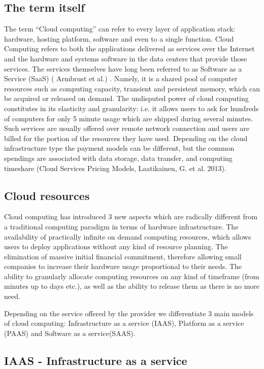 \documentclass[licencjacka,en]{thesisclass}
\begin{document}
\subsection{The term itself}

The term “Cloud computing” can refer to every layer of application stack: hardware, hosting platform, software and even to a single function. Cloud Computing refers to both the applications delivered as services over the Internet and the hardware and systems software in the data centers that provide those services. The services themselves have long been referred to as Software as a Service (SaaS) ( Armbrust et al.) .
Namely, it is a shared pool of computer resources such as computing capacity, transient and persistent memory, which can be acquired or released on demand. The undisputed power of cloud computing constitutes in its elasticity and granularity: i.e. it allows users to ask for hundreds of computers for only 5 minute usage which are shipped during several minutes.  Such services are usually offered over remote network connection and users are billed for the portion of the resources they have used. Depending on the cloud infrastructure type the payment models can be different, but the common spendings are associated with data storage, data transfer, and computing timeshare (Cloud Services Pricing Models, Laatikainen, G. et al. 2013).

\subsection{Cloud resources}

Cloud computing has introduced 3 new aspects which are radically different from a traditional computing paradigm in terms of hardware infrastructure. 
The availability of practically infinite on demand computing resources, which allows users to deploy applications without any kind of resource planning.  
The elimination of massive initial financial commitment, therefore allowing small companies to increase their hardware usage proportional to their needs.
The ability to granularly allocate computing resources on any kind of timeframe (from minutes up to days etc.), as well as the ability to release them as there is no more need.

Depending on the service offered by the provider we differentiate 3 main models of cloud computing: Infrastructure as a service (IAAS), Platform as a service (PAAS) and Software as a service(SAAS).

\subsection{IAAS - Infrastructure as a service}
\end{document}
